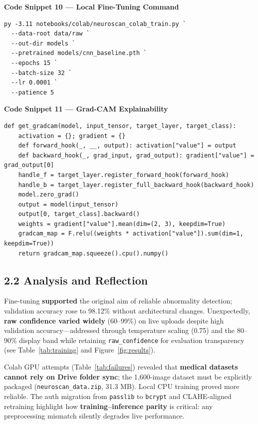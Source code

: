 \documentclass[11pt,a4paper]{article}
\begin{document}
\textbf{Code Snippet 10 --- Local Fine-Tuning Command}

\begin{lstlisting}[style=powershell,caption={Local fine-tuning (\texttt{scripts/finetune\_local.ps1})}]
py -3.11 notebooks/colab/neuroscan_colab_train.py `
  --data-root data/raw `
  --out-dir models `
  --pretrained models/cnn_baseline.pth `
  --epochs 15 `
  --batch-size 32 `
  --lr 0.0001 `
  --patience 5
\end{lstlisting}

\textbf{Code Snippet 11 --- Grad-CAM Explainability}

\begin{lstlisting}[style=python,caption={Grad-CAM heatmap (\texttt{src/04\_gradcam.py})}]
def get_gradcam(model, input_tensor, target_layer, target_class):
    activation = {}; gradient = {}
    def forward_hook(_, __, output): activation["value"] = output
    def backward_hook(_, grad_input, grad_output): gradient["value"] = grad_output[0]
    handle_f = target_layer.register_forward_hook(forward_hook)
    handle_b = target_layer.register_full_backward_hook(backward_hook)
    model.zero_grad()
    output = model(input_tensor)
    output[0, target_class].backward()
    weights = gradient["value"].mean(dim=(2, 3), keepdim=True)
    gradcam_map = F.relu((weights * activation["value"]).sum(dim=1, keepdim=True))
    return gradcam_map.squeeze().cpu().numpy()
\end{lstlisting}

\subsection{2.2 Analysis and Reflection}

Fine-tuning \textbf{supported} the original aim of reliable abnormality detection; validation accuracy rose to 98.12\% without architectural changes. Unexpectedly, \textbf{raw confidence varied widely} (60--99\%) on live uploads despite high validation accuracy---addressed through temperature scaling (0.75) and the 80--90\% display band while retaining \texttt{raw\_confidence} for evaluation transparency (see Table~\ref{tab:training} and Figure~\ref{fig:results}).

Colab GPU attempts (Table~\ref{tab:failures}) revealed that \textbf{medical datasets cannot rely on Drive folder sync}; the 1{,}600-image dataset must be explicitly packaged (\texttt{neuroscan\_data.zip}, 31.3 MB). Local CPU training proved more reliable. The auth migration from \texttt{passlib} to \texttt{bcrypt} and CLAHE-aligned retraining highlight how \textbf{training--inference parity} is critical: any preprocessing mismatch silently degrades live performance.
\end{document}
